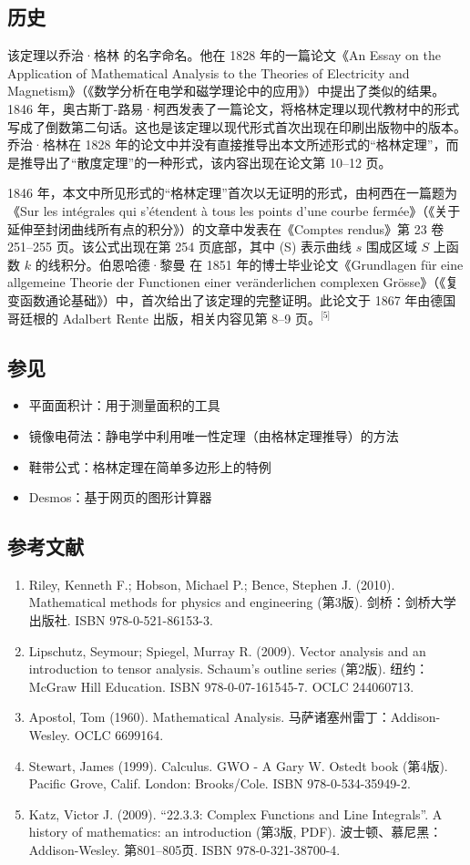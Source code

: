 \subsection{历史}
该定理以乔治·格林 的名字命名。他在 1828 年的一篇论文《An Essay on the Application of Mathematical Analysis to the Theories of Electricity and Magnetism》（《数学分析在电学和磁学理论中的应用》）中提出了类似的结果。1846 年，奥古斯丁-路易·柯西发表了一篇论文，将格林定理以现代教材中的形式写成了倒数第二句话。这也是该定理以现代形式首次出现在印刷出版物中的版本。乔治·格林在 1828 年的论文中并没有直接推导出本文所述形式的“格林定理”，而是推导出了“散度定理”的一种形式，该内容出现在论文第 10–12 页。

1846 年，本文中所见形式的“格林定理”首次以无证明的形式，由柯西在一篇题为《Sur les intégrales qui s'étendent à tous les points d'une courbe fermée》（《关于延伸至封闭曲线所有点的积分》）的文章中发表在《Comptes rendus》第 23 卷 251–255 页。该公式出现在第 254 页底部，其中 (S) 表示曲线 $s$ 围成区域 $S$ 上函数 $k$ 的线积分。伯恩哈德·黎曼 在 1851 年的博士毕业论文《Grundlagen für eine allgemeine Theorie der Functionen einer veränderlichen complexen Grösse》（《复变函数通论基础》）中，首次给出了该定理的完整证明。此论文于 1867 年由德国哥廷根的 Adalbert Rente 出版，相关内容见第 8–9 页。\(^\text{[5]}\)
\subsection{参见}
\begin{itemize}
\item 平面面积计：用于测量面积的工具
\item 镜像电荷法：静电学中利用唯一性定理（由格林定理推导）的方法
\item 鞋带公式：格林定理在简单多边形上的特例
\item Desmos：基于网页的图形计算器
\end{itemize}
\subsection{参考文献}
\begin{enumerate}
\item Riley, Kenneth F.; Hobson, Michael P.; Bence, Stephen J. (2010). Mathematical methods for physics and engineering (第3版). 剑桥：剑桥大学出版社. ISBN 978-0-521-86153-3.
\item Lipschutz, Seymour; Spiegel, Murray R. (2009). Vector analysis and an introduction to tensor analysis. Schaum's outline series (第2版). 纽约：McGraw Hill Education. ISBN 978-0-07-161545-7. OCLC 244060713.
\item Apostol, Tom (1960). Mathematical Analysis. 马萨诸塞州雷丁：Addison-Wesley. OCLC 6699164.
\item Stewart, James (1999). Calculus. GWO - A Gary W. Ostedt book (第4版). Pacific Grove, Calif. London: Brooks/Cole. ISBN 978-0-534-35949-2.
\item Katz, Victor J. (2009). “22.3.3: Complex Functions and Line Integrals”. A history of mathematics: an introduction (第3版, PDF). 波士顿、慕尼黑：Addison-Wesley. 第801–805页. ISBN 978-0-321-38700-4.
\end{enumerate}
